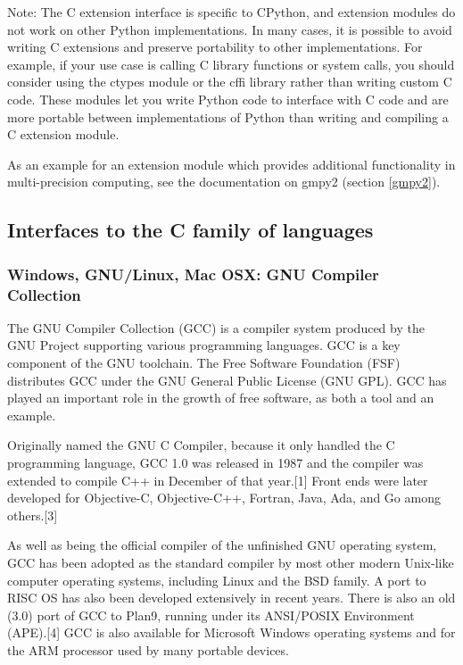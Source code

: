 Note:
The C extension interface is specific to CPython, and extension modules do not work on other Python implementations. In many cases, it is possible to avoid writing C extensions and preserve portability to other implementations. For example, if your use case is calling C library functions or system calls, you should consider using the ctypes module or the cffi library rather than writing custom C code. These modules let you write Python code to interface with C code and are more portable between implementations of Python than writing and compiling a C extension module.

As an example for an extension module which provides additional functionality in multi-precision computing, see the documentation on gmpy2 (section \ref{gmpy2}).





\subsection{Interfaces to the C family of languages}

\subsubsection{Windows, GNU/Linux, Mac OSX: GNU Compiler Collection}
The GNU Compiler Collection (GCC) is a compiler system produced by the GNU Project supporting various programming languages. GCC is a key component of the GNU toolchain. The Free Software Foundation (FSF) distributes GCC under the GNU General Public License (GNU GPL). GCC has played an important role in the growth of free software, as both a tool and an example.

\vpara
Originally named the GNU C Compiler, because it only handled the C programming language, GCC 1.0 was released in 1987 and the compiler was extended to compile C++ in December of that year.[1] Front ends were later developed for Objective-C, Objective-C++, Fortran, Java, Ada, and Go among others.[3]

\vpara
As well as being the official compiler of the unfinished GNU operating system, GCC has been adopted as the standard compiler by most other modern Unix-like computer operating systems, including Linux and the BSD family. A port to RISC OS has also been developed extensively in recent years. There is also an old (3.0) port of GCC to Plan9, running under its ANSI/POSIX Environment (APE).[4] GCC is also available for Microsoft Windows operating systems and for the ARM processor used by many portable devices.

